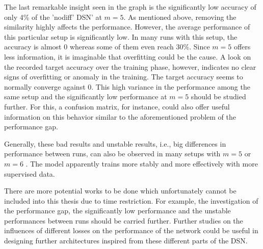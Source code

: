 The last remarkable insight seen in the graph is the significantly low accuracy of only 4\% of the 'nodiff' DSN' at $m = 5$. As mentioned above, removing the similarity highly affects the performance. However, the average performance of this particular setup is significantly low. In many runs with this setup, the accuracy is almost 0 whereas some of them even reach 30\%. Since $m = 5$ offers less information, it is imaginable that overfitting could be the cause. A look on the recorded target accuracy over the training phase, however, indicates no clear signs of overfitting or anomaly in the training. The target accuracy seems to normally converge against 0. This high variance in the performance among the same setup and the significantly low performance at $m=5$ should be studied further. For this, a confusion matrix, for instance, could also offer useful information on this behavior similar to the aforementioned problem of the performance gap.

Generally, these bad results and unstable results, i.e., big differences in performance between runs, can also be observed in many setups with $m = 5$ or $m = 6$ . The model apparently trains more stably and more effectively with more supervised data. 

 There are more potential works to be done which unfortunately cannot be included into this thesis due to time restriction. For example, the investigation of the performance gap, the significantly low performance and the unstable performances between runs should be carried further. Further studies on the influences of different losses on the performance of the network could be useful in designing further architectures inspired from these different parts of the DSN. 

